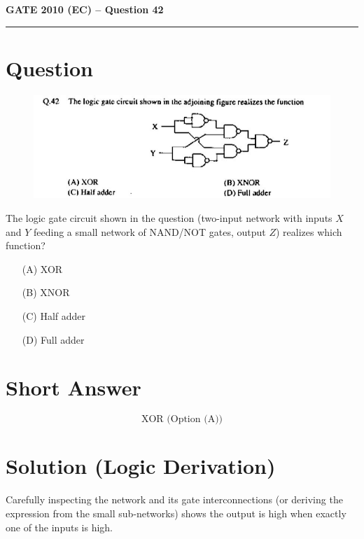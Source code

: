 \documentclass[12pt,a4paper]{article}
\begin{document}
\pagestyle{fancy}
\fancyhf{}

\begin{center}
    {\Large \textbf{GATE 2010 (EC) – Question 42 }}\\[4pt]
    \rule{0.9\linewidth}{0.4pt}
\end{center}

\section*{Question}
\begin{figure}[H]
	\centering
	\includegraphics[width=0.8\linewidth]{question42.png}
\end{figure}
The logic gate circuit shown in the question (two-input network with inputs $X$ and $Y$ feeding a small network of NAND/NOT gates, output $Z$) realizes which function?
\begin{enumerate}
    \item[(A)] XOR \qquad
    \item[(B)] XNOR \qquad
    \item[(C)] Half adder \qquad
    \item[(D)] Full adder
\end{enumerate}

\section*{Short Answer}
\[
\boxed{\text{XOR (Option (A))}}
\]

\section*{Solution (Logic Derivation)}
Carefully inspecting the network and its gate interconnections (or deriving the expression from the small sub-networks) shows the output is high when exactly one of the inputs is high.
\end{document}
